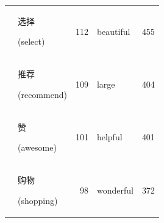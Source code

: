 \documentclass[smallextended,natbib]{svjour3}       %
\providecommand{\DIFaddend}{} %
\begin{document}
\begin{table}[ht]
{\begin{tabular}{|c|lr|lr|}
                                                             & \begin{CJK}{UTF8}{gbsn}选择\end{CJK} (select)          & 112   & beautiful   & 455   \\  
                                                             & \begin{CJK}{UTF8}{gbsn}推荐\end{CJK} (recommend)       & 109   & large       & 404   \\  
                                                             & \begin{CJK}{UTF8}{gbsn}赞\end{CJK} (awesome)          & 101   & helpful     & 401   \\  
                                                             & \begin{CJK}{UTF8}{gbsn}购物\end{CJK} (shopping)        & 98    & wonderful   & 372   \\ \hline
        \end{tabular}%
        }
    \end{table}
\DIFaddend 
\end{document}
